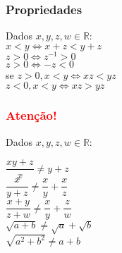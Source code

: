 
\begin{multicols}{2}
\subsubsection*{Propriedades}

Dados $x,y,z,w \in \mathbb{R}$:\\
$x<y \iff x+z < y+z$\\
$z>0 \iff z^{-1}>0$\\
$z>0 \iff -z<0$\\
se  $z>0, x<y \iff xz<yz$\\
$z<0, x<y \iff xz>yz$

\subsubsection*{\textcolor{red}{Atenção!}}

Dados $x,y,z,w \in \mathbb{R}$:
\begin{multicols}{2}
$\dfrac{xy + z}{x}\neq y+z$\\[0.15cm]
$\dfrac{x}{y+z}\neq \dfrac{x}{y}+\dfrac{x}{z}$\\[0.15cm]
$\dfrac{x+y}{z+w}\neq \dfrac{x}{y}+\dfrac{z}{w}$\\[0.15cm]
$\sqrt{a+b}\neq \sqrt{a}+\sqrt{b}$\\[0.15cm]
$\sqrt{a^2+b^2}\neq a+b$\\
\end{multicols}
\end{multicols}
